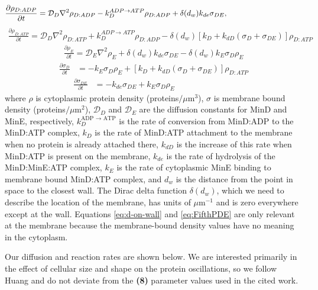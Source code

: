 \documentclass[10pt,letterpaper]{article}
\newcommand\micron{\ensuremath{\mu\text{m}}}
\newcommand{\blue}[1]{{\bf \color{blue} #1}}
\begin{document}
\begin{align}
  \frac{\partial \rho_{D:ADP}}{\partial t} = \mathcal{D}_D\nabla^2\rho_{D:ADP}-k_D^{ADP\rightarrow ATP}\rho_{D:ADP}+\delta(d_w)k_{de}\sigma_{DE},\hspace{3.4cm}
\end{align}
\begin{align}
  \frac{\partial \rho_{D:ATP}}{\partial t} = \mathcal{D}_D\nabla^2\rho_{D:ATP}+k_D^{ADP\rightarrow ATP}\rho_{D:ADP}-\delta(d_w)[k_D+k_{dD}(\sigma_D+\sigma_{DE})]\rho_{D:ATP}
\end{align}
\begin{align}
  \frac{\partial \rho_E}{\partial t} = \mathcal{D}_E\nabla^2\rho_E+\delta(d_w)k_{de}\sigma_{DE}
  -\delta(d_w)k_E \sigma_D \rho_E
\end{align}
\begin{align}
  \frac{\partial \sigma_D}{\partial t} &= -k_E\sigma_D\rho_E
  +[k_D+k_{dD}(\sigma_D+\sigma_{DE})]\rho_{D:ATP}
  \label{eq:d-on-wall}
\end{align}
\begin{align}
  \frac{\partial \sigma_{DE}}{\partial t} &= -k_{de}\sigma_{DE}+k_E\sigma_D\rho_E\hspace{3cm}
  \label{eq:FifthPDE}
\end{align}
where $\rho$ is cytoplasmic protein density (proteins$/\micron^{3}$), $\sigma$
is membrane bound density (proteins$/\micron^{2}$), $\mathcal{D}_D$ and
$\mathcal{D}_{E}$ are the diffusion constants for MinD and MinE,
respectively, $k_D^{\textrm{ADP $\rightarrow$ ATP}}$ is the rate of
conversion from MinD:ADP to the MinD:ATP complex, $k_D$ is the rate of
MinD:ATP attachment to the membrane when no protein is already
attached there, $k_{dD}$ is the increase of this rate when MinD:ATP is
present on the membrane, $k_{de}$ is the rate of hydrolysis of the
MinD:MinE:ATP complex, $k_E$ is the rate of cytoplasmic MinE binding
to membrane bound MinD:ATP complex, and $d_w$ is the distance from the
point in space to the closest wall.  The Dirac delta function
$\delta(d_w)$, which we need to describe the location of the membrane,
has units of $\micron^{-1}$ and is zero everywhere except at the wall.
Equations \ref{eq:d-on-wall} and \ref{eq:FifthPDE} are only relevant
at the membrane because the membrane-bound density values have no
meaning in the cytoplasm.

Our diffusion and reaction rates are shown below.  We are interested
primarily in the effect of cellular size and shape on the protein
oscillations, so we follow Huang\cite{huang2003dynamic} and do not
deviate from the \blue{(8)} parameter values used in the cited work.
\end{document}

